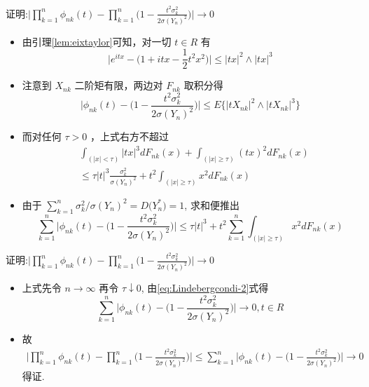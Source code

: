 	\begin{frame}{证明:$\big|\prod_{k=1}^{n} \phi_{n k}(t)-\prod_{k=1}^{n}\big(1-\frac{t^{2} \sigma_{k}^{2}}{2 \sigma(Y_n)^2}\big)\big| \rightarrow 0$}
		\vspace{-0.1cm}
		\begin{itemize}
			\item 由引理\ref{lem:eixtaylor}可知，对一切 $t \in R$ 有
		\[
		\big|e^{i t x}-\big(1+i t x-\frac{1}{2} t^{2} x^{2}\big)\big| \leq|t x|^{2} \wedge|t x|^{3}
		\]
		\item 注意到 $X_{nk}$ 二阶矩有限，两边对 $F_{n k}$ 取积分得
		\[
		\big|\phi_{n k}(t)-\big(1-\frac{t^{2} \sigma_{k}^{2}}{2 \sigma(Y_n)^{2}}\big)\big| \leq E\big\{\big|t X_{nk}\big|^{2} \wedge\big|t X_{nk}\big|^{3}\big\}
		\]
		\item 而对任何 $\tau>0$ ，上式右方不超过
		\begin{align*}
			&\int_{(|x|<\tau)}|t x|^{3} d F_{n k}(x)+\int_{(|x| \geq \tau)}(t x)^{2} d F_{n k}(x)\\
			&\leq \tau|t|^{3} \frac{\sigma_{k}^{2}}{\sigma(Y_n)^{2}}+t^{2} \int_{(|x| \geq \tau)} x^{2} d F_{n k}(x)
		\end{align*}
		\item 由于 $\sum_{k=1}^{n} \sigma_{k}^{2} / \sigma(Y_n)^{2}=D\big(Y_n^*\big)=1$, 求和便推出
		\[
		\sum_{k=1}^{n}\big|\phi_{n k}(t)-\big(1-\frac{t^{2} \sigma_{k}^{2}}{2 \sigma(Y_n)^{2}}\big)\big| \leq \tau|t|^{3}+t^{2} \sum_{k=1}^{n} \int_{(|x| \geq \tau)} x^{2} d F_{n k}(x)
		\]
		\end{itemize}
	\end{frame}

	\begin{frame}{证明:$\big|\prod_{k=1}^{n} \phi_{n k}(t)-\prod_{k=1}^{n}\big(1-\frac{t^{2} \sigma_{k}^{2}}{2 \sigma(Y_n)^2}\big)\big| \rightarrow 0$}
\begin{itemize}
	\item 上式先令 $n \rightarrow \infty$ 再令 $\tau \downarrow 0$, 由\eqref{eq:Lindebergcondi-2}式得
	\[
	\sum_{k=1}^{n}\big|\phi_{n k}(t)-\big(1-\frac{t^{2} \sigma_{k}^{2}}{2 \sigma(Y_n)^2}\big)\big| \rightarrow 0,  t \in R
	\]
	\item 故
	\begin{align*}
		\big|\prod_{k=1}^{n} \phi_{n k}(t)-\prod_{k=1}^{n}\big(1-\frac{t^{2} \sigma_{k}^{2}}{2 \sigma(Y_n)^2}\big)\big|\leq  \sum_{k=1}^{n}\big|\phi_{n k}(t)-\big(1-\frac{t^{2} \sigma_{k}^{2}}{2 \sigma(Y_n)^2}\big)\big| \rightarrow 0
	\end{align*}得证.
\end{itemize}
	\end{frame}

